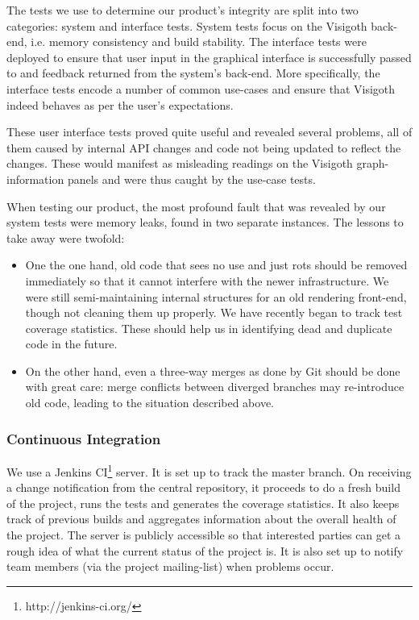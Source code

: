 \documentclass[a4paper,11pt,titlepage]{article}
\begin{document}
The tests we use to determine our product's integrity are split
into two categories: system and interface tests. System tests focus
on the Visigoth back-end, i.e. memory consistency and build stability.
The interface tests were deployed to ensure that user input in the
graphical interface is successfully passed to and feedback returned
from the system's back-end. More specifically, the interface tests
encode a number of common use-cases and ensure that Visigoth indeed
behaves as per the user's expectations.

These user interface tests proved quite useful and revealed several
problems, all of them caused by internal API changes and code not
being updated to reflect the changes. These would manifest as
misleading readings on the Visigoth graph-information panels and
were thus caught by the use-case tests.

When testing our product, the most profound fault that was revealed
by our system tests were memory leaks, found in two separate
instances. The lessons to take away were twofold:
\begin{itemize}
  \item One the one hand, old code that sees no use and just rots
        should be removed immediately so that it cannot interfere
        with the newer infrastructure. We were still semi-maintaining
        internal structures for an old rendering front-end, though
        not cleaning them up properly. We have recently began to
        track test coverage statistics. These should help us in
        identifying dead and duplicate code in the future.
  \item On the other hand, even a three-way merges as done by Git
        should be done with great care: merge conflicts between
        diverged branches may re-introduce old code, leading to
        the situation described above.
\end{itemize}

\subsubsection{Continuous Integration}
We use a Jenkins CI\footnote{http://jenkins-ci.org/} server. It is
set up to track the master branch. On receiving a change notification
from the central repository, it proceeds to do a fresh build of the
project, runs the tests and generates the coverage statistics. It
also keeps track of previous builds and aggregates information about
the overall health of the project.
The server is publicly accessible so that interested parties can get
a rough idea of what the current status of the project is. It is also
set up to notify team members (via the project mailing-list) when
problems occur.
\end{document}

